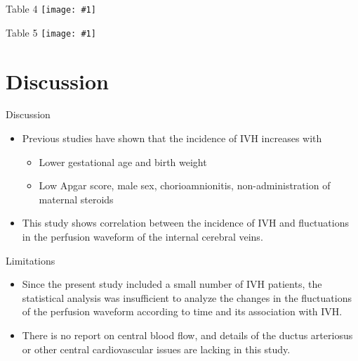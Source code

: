 \documentclass{beamer}
\newcommand*{\solo}[1]{\centering\texttt{[image: \#1]}}
\begin{document}
\begin{frame}{Table 4}
    \solo{T4.eps}
\end{frame}

\begin{frame}{Table 5}
    \solo{T5.eps}
\end{frame}

\section{Discussion}
\begin{frame}{Discussion}
    \begin{itemize}
        \item Previous studies have shown that the incidence of IVH increases with
            \begin{itemize}
                \item Lower gestational age and birth weight
                \item Low Apgar score, male sex, chorioamnionitis, non-administration of maternal steroids
            \end{itemize}
        \item This study shows correlation between the incidence of IVH and
            fluctuations in the perfusion waveform of the internal cerebral
            veins.
    \end{itemize}
\end{frame}

\begin{frame}{Limitations}
    \begin{itemize}
        \item Since the present study included a small number of IVH patients,
            the statistical analysis was insufficient to analyze the changes in
            the fluctuations of the perfusion waveform according to time and
            its association with IVH.
        \item There is no report on central blood flow, and details of the
            ductus arteriosus or other central cardiovascular issues are
            lacking in this study.
    \end{itemize}
\end{frame}
\end{document}
